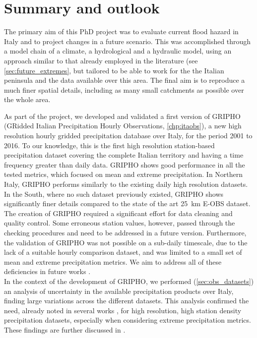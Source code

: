 \chapter{Summary and outlook}\label{chp:conclusions}
The primary aim of this PhD project was to evaluate current flood hazard in Italy and to project changes in a future scenario.
This was accomplished through a model chain of a climate, a hydrological and a hydraulic model, using an approach similar to that already employed in the literature (see \cref{sec:future_extremes}, but tailored to be able to work for the the Italian peninsula  and the data available over this area. The final aim is  to reproduce a much finer spatial details, including as many small catchments as possible over the whole area.

As part of the project, we developed and validated a first version of GRIPHO (GRidded Italian Precipitation Hourly Observations, \cref{chp:itaobs}), a new high resolution hourly gridded precipitation database over Italy, for the period 2001 to 2016.
To our knowledge, this is the first high resolution station-based precipitation dataset covering the complete Italian territory and having a time frequency greater than daily data.
GRIPHO shows good performance in all the tested metrics, which focused on mean and extreme precipitation. In Northern Italy, GRIPHO performs similarly to the existing daily high resolution datasets. In the South, where no such dataset previously existed, GRIPHO shows significantly finer details compared to the state of the art \SI{25}{\kilo\meter} E-OBS dataset.
The creation of GRIPHO required a significant effort for  data cleaning and quality control.
Some erroneous station values, however, passed through the checking procedures and need to be addressed in a future version.
Furthermore, the validation of GRIPHO was not possible on a sub-daily timescale, due to the lack of a suitable hourly comparison dataset, and was limited to a small set of mean and extreme precipitation metrics.
We aim to address all of these deficiencies in future works \citep[][in preparation]{Fantini2019a}.\\
In the context of the development of GRIPHO, we performed (\cref{sec:obs_datasets}) an analysis of uncertainty in the available precipitation products over Italy, finding large variations across the different datasets.
This analysis confirmed the need, already noted in several works \citep{Fantini2016,Prein2016,Prein2017}, for high resolution, high station density precipitation datasets, especially when considering extreme precipitation metrics.
These findings are further discussed in \citet[][in preparation]{Fantini2019b}.

